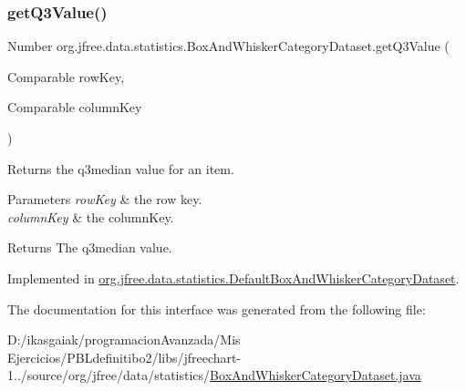 \subsubsection{\texorpdfstring{get\+Q3\+Value()}{getQ3Value()}\hspace{0.1cm}{\footnotesize\ttfamily [2/2]}}
{\footnotesize\ttfamily Number org.\+jfree.\+data.\+statistics.\+Box\+And\+Whisker\+Category\+Dataset.\+get\+Q3\+Value (\begin{DoxyParamCaption}\item[{Comparable}]{row\+Key,  }\item[{Comparable}]{column\+Key }\end{DoxyParamCaption})}

Returns the q3median value for an item.


\begin{DoxyParams}{Parameters}
{\em row\+Key} & the row key. \\
\hline
{\em column\+Key} & the column\+Key.\\
\hline
\end{DoxyParams}
\begin{DoxyReturn}{Returns}
The q3median value. 
\end{DoxyReturn}


Implemented in \mbox{\hyperlink{classorg_1_1jfree_1_1data_1_1statistics_1_1_default_box_and_whisker_category_dataset_acb0aafdae7cb218b7164669d19f81b96}{org.\+jfree.\+data.\+statistics.\+Default\+Box\+And\+Whisker\+Category\+Dataset}}.



The documentation for this interface was generated from the following file\+:\begin{DoxyCompactItemize}
\item 
D\+:/ikasgaiak/programacion\+Avanzada/\+Mis Ejercicios/\+P\+B\+Ldefinitibo2/libs/jfreechart-\/1../source/org/jfree/data/statistics/\mbox{\hyperlink{_box_and_whisker_category_dataset_8java}{Box\+And\+Whisker\+Category\+Dataset.\+java}}\end{DoxyCompactItemize}
